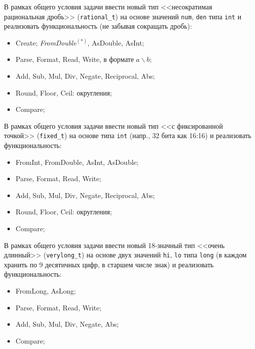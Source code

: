 
\begin{zztask}
В рамках общего условия задачи ввести новый тип <<несократимая рациональная
дробь>> (\texttt{rational\_t}) на основе значений \texttt{num}, \texttt{den}
типа \texttt{int} и реализовать функциональность (не забывая сокращать дробь):
%
\begin{itemize}
\item Create; \textit{FromDouble}${}^{(\ast)}$, AsDouble, AsInt;
\item Parse, Format, Read, Write, в формате $a\backslash b$;
\item Add, Sub, Mul, Div, Negate, Reciprocal, Abs;
\item Round, Floor, Ceil: округления;
\item Compare;
\end{itemize}
\end{zztask}


\begin{zztask}
В рамках общего условия задачи ввести новый тип <<с фиксированной точкой>>
(\texttt{fixed\_t}) на основе типа \texttt{int} (напр., 32 бита как 16:16) и
реализовать функциональность:
%
\begin{itemize}
\item FromInt, FromDouble, AsInt, AsDouble;
\item Parse, Format, Read, Write;
\item Add, Sub, Mul, Div, Negate, Reciprocal, Abs;
\item Round, Floor, Ceil: округления;
\item Compare;
\end{itemize}
\end{zztask}


\begin{zztask}
В рамках общего условия задачи ввести новый 18-значный тип <<очень длинный>>
(\texttt{verylong\_t}) на основе двух значений \texttt{hi}, \texttt{lo} типа
\texttt{long} (в каждом хранить по 9 десятичных цифр, в старшем числе знак) и
реализовать функциональность:
%
\begin{itemize}
\item FromLong, AsLong;
\item Parse, Format, Read, Write;
\item Add, Sub, Mul, Div, Negate, Abs;
\item Compare;
\end{itemize}
\end{zztask}

